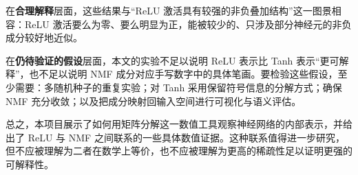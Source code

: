 \documentclass[UTF8,a4paper,11pt]{ctexart}
\begin{document}
在\textbf{合理解释}层面，这些结果与“ReLU 激活具有较强的非负叠加结构”这一图景相容：ReLU 激活要么为零、要么明显为正，能被较少的、只涉及部分神经元的非负成分较好地近似。

在\textbf{仍待验证的假设}层面，本文的实验不足以说明 ReLU 表示比 Tanh 表示“更可解释”，也不足以说明 NMF 成分对应手写数字中的具体笔画。要检验这些假设，至少需要：多随机种子的重复实验；对 Tanh 采用保留符号信息的分解方式；确保 NMF 充分收敛；以及把成分映射回输入空间进行可视化与语义评估。

总之，本项目展示了如何用矩阵分解这一数值工具观察神经网络的内部表示，并给出了 ReLU 与 NMF 之间联系的一些具体数值证据。这种联系值得进一步研究，但不应被理解为二者在数学上等价，也不应被理解为更高的稀疏性足以证明更强的可解释性。


\end{document}
